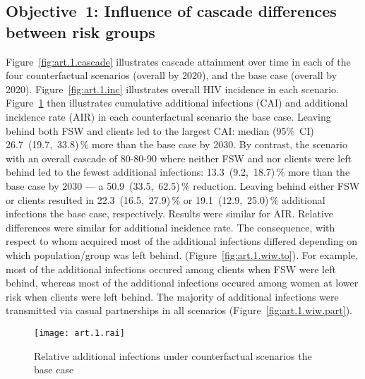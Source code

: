\subsection{Objective~1: Influence of cascade differences between risk groups}\label{art.res.1}
Figure~\ref{fig:art.1.cascade} illustrates cascade attainment over time
in each of the four counterfactual scenarios (\casmd overall by 2020),
and the base case (\cashi overall by 2020).
Figure~\ref{fig:art.1.inc} illustrates overall HIV incidence in each scenario.
Figure~\ref{fig:art.1.rai} then illustrates
cumulative additional infections (CAI) and additional incidence rate (AIR)
in each counterfactual scenario \vs the base case.
Leaving behind both FSW and clients led to the largest CAI: median (95\%~CI)
26.7~(19.7,~33.8)\,\% more than the base case by 2030. %
By contrast, the scenario with an overall cascade of 80-80-90 where neither
FSW and nor clients were left behind led to the fewest additional infections:
13.3~(9.2,~18.7)\,\% more than the base case by 2030 --- %
a 50.9~(33.5,~62.5)\,\% reduction. %
Leaving behind either FSW or clients resulted in
22.3~(16.5,~27.9)\,\% or 19.1~(12.9,~25.0)\,\% additional infections
\vs the base case, respectively. %
Results were similar for AIR.
Relative differences were similar for additional incidence rate.
The consequence, with respect to whom acquired most of the additional infections
differed depending on which population/group was left behind.
(Figure~\ref{fig:art.1.wiw.to}).
For example, most of the additional infections occured among clients when FSW were left behind,
whereas most of the additional infections occured among women at lower risk when clients were left behind.
The majority of additional infections were transmitted
via casual partnerships in all scenarios (Figure~\ref{fig:art.1.wiw.part}). %
\begin{figure}[h]
  \centering\texttt{[image: art.1.rai]}
  \caption{Relative additional infections under counterfactual scenarios \vs the base case}
  \label{fig:art.1.rai}
\end{figure}
